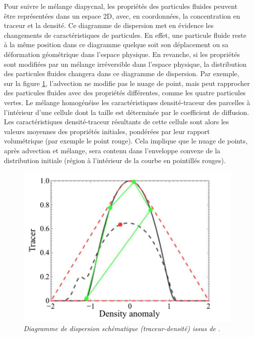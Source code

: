\documentclass[a4paper,12pt]{article}
\begin{document}
        Pour suivre le mélange diapycnal, les propriétés des particules fluides peuvent être représentées dans un espace 2D, avec, en coordonnées, la concentration en traceur et la densité. 
        Ce diagramme de dispersion met en évidence les changements de caractéristiques de particules. En effet, une particule fluide reste à la même position dans ce diagramme quelque soit son déplacement ou sa déformation géométrique dans l'espace physique. En revanche, si les propriétés sont modifiées par un mélange irréversible dans l'espace physique, la distribution des particules fluides changera dans ce diagramme de dispersion. Par exemple, sur la figure \ref{Fig8}, l'advection ne modifie pas le nuage de point, mais peut rapprocher des particules fluides avec des propriétés différentes, comme les quatre particules vertes. Le mélange homogénéise les caractéristiques densité-traceur des parcelles à l'intérieur d'une cellule dont la taille est déterminée par le coefficient de diffusion. Les caractéristiques densité-traceur résultants de cette cellule sont alors les valeurs moyennes des propriétés initiales, pondérées par leur rapport volumétrique (par exemple le point rouge). Cela implique que le nuage de points, après advection et mélange, sera contenu dans l'enveloppe convexe de la distribution initiale (région à l'intérieur de la courbe en pointillés rouges). \\
        \begin{figure}[!h]
            \centering
            \includegraphics{figures/fig8_Jared.PNG}
            \caption{\textit{Diagramme de dispersion schématique (traceur-densité) issus de
            \cite{penney_diapycnal_2020}.}}
            \label{Fig8}
        \end{figure}
        \newline
\end{document}
